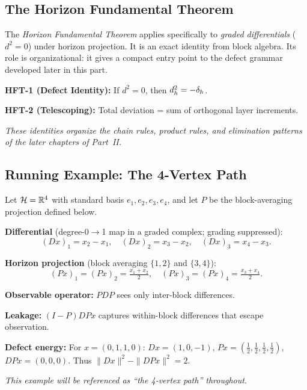 \subsection{The Horizon Fundamental Theorem}

The \emph{Horizon Fundamental Theorem} applies specifically to \emph{graded
differentials} ($d^2 = 0$) under horizon projection. It is an exact identity
from block algebra. Its role is organizational: it gives a compact entry point
to the defect grammar developed later in this part.

\begin{tcolorbox}[colback=black!3, colframe=black!50, title={Horizon Fundamental Theorem (Preview)}]
\textbf{HFT-1 (Defect Identity):} If $d^2 = 0$, then $\CCObs{d}{h}^2 = -\CCDefect{d}{h}$.

\smallskip
\textbf{HFT-2 (Telescoping):} Total deviation = sum of orthogonal layer increments.

\smallskip
\emph{These identities organize the chain rules, product rules, and elimination patterns of the later chapters of Part~II.}
\end{tcolorbox}

\subsection{Running Example: The 4-Vertex Path}
\label{subsec:hello-world}

\begin{example}
\label{ex:hello-world}
Let $\cH = \bbR^4$ with standard basis $e_1, e_2, e_3, e_4$, and let $P$ be
the block-averaging projection defined below.

\textbf{Differential} (degree-0$\to$1 map in a graded complex; grading suppressed):
\[
(Dx)_1 = x_2 - x_1, \quad (Dx)_2 = x_3 - x_2, \quad (Dx)_3 = x_4 - x_3.
\]

\textbf{Horizon projection} (block averaging $\{1,2\}$ and $\{3,4\}$):
\[
(P x)_1 = (P x)_2 = \tfrac{x_1+x_2}{2}, \quad
(P x)_3 = (P x)_4 = \tfrac{x_3+x_4}{2}.
\]

\textbf{Observable operator:} $PDP$ sees only inter-block differences.

\textbf{Leakage:} $(I-P)DPx$ captures within-block differences that escape observation.

\textbf{Defect energy:} For $x = (0,1,1,0)$:
$Dx = (1,0,-1)$, $Px = (\frac{1}{2}, \frac{1}{2}, \frac{1}{2}, \frac{1}{2})$, $DPx = (0,0,0)$.
Thus $\|Dx\|^2 - \|DPx\|^2 = 2$.

\emph{This example will be referenced as ``the 4-vertex path'' throughout.}
\end{example}


